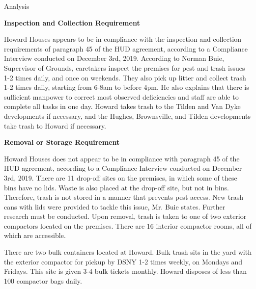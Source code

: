Analysis

\textbf{Inspection and Collection Requirement}

Howard Houses appears to be in compliance with the inspection and collection requirements of paragraph 45 of the HUD agreement, according to a Compliance Interview conducted on December 3rd, 2019. According to Norman Buie, Supervisor of Grounds, caretakers inspect the premises for pest and trash issues 1-2 times daily, and once on weekends. They also pick up litter and collect trash 1-2 times daily, starting from 6-8am to before 4pm. He also explains that there is sufficient manpower to correct most observed deficiencies and staff are able to complete all tasks in one day. Howard takes trash to the Tilden and Van Dyke developments if necessary, and the Hughes, Brownsville, and Tilden developments take trash to Howard if necessary.

\textbf{Removal or Storage Requirement} 

Howard Houses does not appear to be in compliance with paragraph 45 of the HUD agreement, according to a Compliance Interview conducted on December 3rd, 2019. There are 11 drop-off sites on the premises, in which some of these bins have no lids. Waste is also placed at the drop-off site, but not in bins. Therefore, trash is not stored in a manner that prevents pest access. New trash cans with lids were provided to tackle this issue, Mr. Buie states. Further research must be conducted. Upon removal, trash is taken to one of two exterior compactors located on the premises. There are 16 interior compactor rooms, all of which are accessible. 

There are two bulk containers located at Howard. Bulk trash sits in the yard with the exterior compactor for pickup by DSNY 1-2 times weekly, on Mondays and Fridays. This site is given 3-4 bulk tickets monthly. Howard disposes of less than 100 compactor bags daily. 